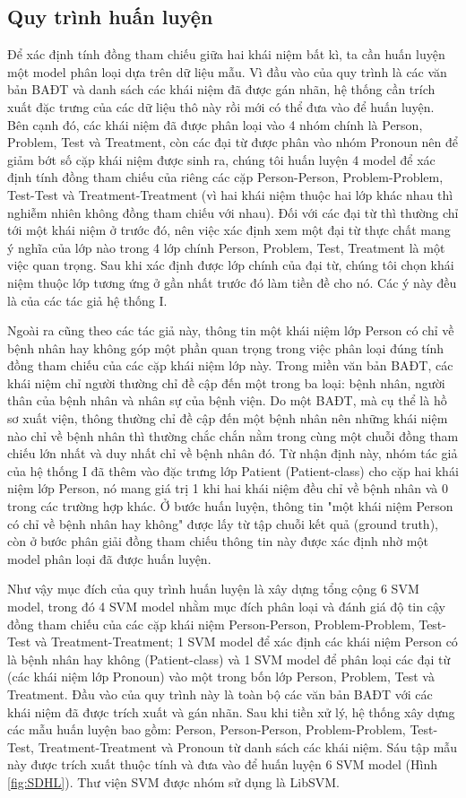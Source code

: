 \subsection*{Quy trình huấn luyện}
Để xác định tính đồng tham chiếu giữa hai khái niệm bất kì, ta cần huấn luyện một model phân loại dựa trên dữ liệu mẫu. Vì đầu vào của quy trình là các văn bản BAĐT và danh sách các khái niệm đã được gán nhãn, hệ thống cần trích xuất đặc trưng của các dữ liệu thô này rồi mới có thể đưa vào để huấn luyện. Bên cạnh đó, các khái niệm đã được phân loại vào 4 nhóm chính là Person, Problem, Test và Treatment, còn các đại từ được phân vào nhóm Pronoun nên để giảm bớt số cặp khái niệm được sinh ra, chúng tôi huấn luyện 4 model để xác định tính đồng tham chiếu của riêng các cặp Person-Person, Problem-Problem, Test-Test và Treatment-Treatment (vì hai khái niệm thuộc hai lớp khác nhau thì nghiễm nhiên không đồng tham chiếu với nhau). Đối với các đại từ thì thường chỉ tới một khái niệm ở trước đó, nên việc xác định xem một đại từ thực chất mang ý nghĩa của lớp nào trong 4 lớp chính Person, Problem, Test, Treatment là một việc quan trọng. Sau khi xác định được lớp chính của đại từ, chúng tôi chọn khái niệm thuộc lớp tương ứng ở gần nhất trước đó làm tiền đề cho nó. Các ý này đều là của các tác giả hệ thống I.

Ngoài ra cũng theo các tác giả này, thông tin một khái niệm lớp Person có chỉ về bệnh nhân hay không góp một phần quan trọng trong việc phân loại đúng tính đồng tham chiếu của các cặp khái niệm lớp này. Trong miền văn bản BAĐT, các khái niệm chỉ người thường chỉ đề cập đến một trong ba loại: bệnh nhân, người thân của bệnh nhân và nhân sự của bệnh viện. Do một BAĐT, mà cụ thể là hồ sơ xuất viện, thông thường chỉ đề cập đến một bệnh nhân nên những khái niệm nào chỉ về bệnh nhân thì thường chắc chắn nằm trong cùng một chuỗi đồng tham chiếu lớn nhất và duy nhất chỉ về bệnh nhân đó. Từ nhận định này, nhóm tác giả của hệ thống I đã thêm vào đặc trưng lớp Patient (Patient-class) cho cặp hai khái niệm lớp Person, nó mang giá trị 1 khi hai khái niệm đều chỉ về bệnh nhân và 0  trong các trường hợp khác. Ở bước huấn luyện, thông tin "một khái niệm Person có chỉ về bệnh nhân hay không" được lấy từ tập chuỗi kết quả (ground truth), còn ở bước phân giải đồng tham chiếu thông tin này được xác định nhờ một model phân loại đã được huấn luyện.

Như vậy mục đích của quy trình huấn luyện là xây dựng tổng cộng 6 SVM model, trong đó 4 SVM model nhằm mục đích phân loại và đánh giá độ tin cậy đồng tham chiếu của các cặp khái niệm Person-Person, Problem-Problem, Test-Test và Treatment-Treatment; 1 SVM model để xác định các khái niệm Person có là bệnh nhân hay không (Patient-class) và 1 SVM model để phân loại các đại từ (các khái niệm lớp Pronoun) vào một trong bốn lớp Person, Problem, Test và Treatment. Đầu vào của quy trình này là toàn bộ các văn bản BAĐT với các khái niệm đã được trích xuất và gán nhãn. Sau khi tiền xử lý, hệ thống xây dựng các mẫu huấn luyện
bao gồm: Person, Person-Person, Problem-Problem, Test-Test, Treatment-Treatment và Pronoun từ danh sách các khái niệm. Sáu tập mẫu này được trích xuất thuộc tính và đưa vào để huấn luyện 6 SVM model (Hình \ref{fig:SDHL}). Thư viện SVM được nhóm sử dụng là LibSVM. 


